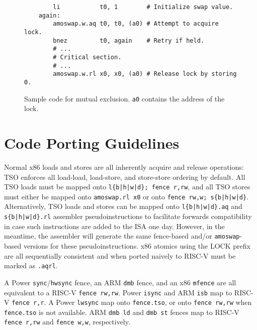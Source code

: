 \begin{figure}[h!]
\begin{center}
\begin{verbatim}
        li           t0, 1        # Initialize swap value.
    again:
        amoswap.w.aq t0, t0, (a0) # Attempt to acquire lock.
        bnez         t0, again    # Retry if held.
        # ...
        # Critical section.
        # ...
        amoswap.w.rl x0, x0, (a0) # Release lock by storing 0.
\end{verbatim}
\end{center}
\caption{Sample code for mutual exclusion.  {\tt a0} contains the address of the lock.}
\label{critical}
\end{figure}

\section{Code Porting Guidelines}
\label{sec:porting}

Normal x86 loads and stores are all inherently acquire and release operations: TSO enforces all load-load, load-store, and store-store ordering by default.
All TSO loads must be mapped onto {\tt l\{b|h|w|d\}; fence r,rw}, and all TSO stores must either be mapped onto {\tt amoswap.rl x0} or onto {\tt fence rw,w; s\{b|h|w|d\}}.
Alternatively, TSO loads and stores can be mapped onto {\tt l\{b|h|w|d\}.aq} and {\tt s\{b|h|w|d\}.rl} assembler pseudoinstructions to facilitate forwards compatibility in case such instructions are added to the ISA one day.
However, in the meantime, the assembler will generate the same fence-based and/or {\tt amoswap}-based versions for these pseudoinstructions.
x86 atomics using the LOCK prefix are all sequentially consistent and when ported naively to RISC-V must be marked as {\tt .aqrl}.

A Power {\tt sync}/{\tt hwsync} fence, an ARM {\tt dmb} fence, and an x86 {\tt mfence} are all equivalent to a RISC-V {\tt fence rw,rw}.
Power {\tt isync} and ARM {\tt isb} map to RISC-V {\tt fence r,r}.
A Power {\tt lwsync} map onto {\tt fence.tso}, or onto {\tt fence rw,rw} when {\tt fence.tso} is not available.
ARM {\tt dmb ld} and {\tt dmb st} fences map to RISC-V {\tt fence r,rw} and {\tt fence w,w}, respectively.

